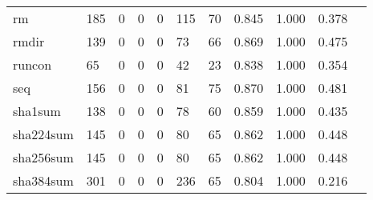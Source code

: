 \begin{longtable}{lp{1.10cm}p{1.10cm}p{1.10cm}p{1.10cm}p{1.10cm}p{1.10cm}p{1.10cm}p{1.10cm}p{1.10cm}p{1.10cm}}
rm        &                    185 &                                  0 &                                 0 &                                0 &                               115 &                              70 &                          0.845 &                                 1.000 &                               0.378 \\
rmdir     &                    139 &                                  0 &                                 0 &                                0 &                                73 &                              66 &                          0.869 &                                 1.000 &                               0.475 \\
runcon    &                     65 &                                  0 &                                 0 &                                0 &                                42 &                              23 &                          0.838 &                                 1.000 &                               0.354 \\
seq       &                    156 &                                  0 &                                 0 &                                0 &                                81 &                              75 &                          0.870 &                                 1.000 &                               0.481 \\
sha1sum   &                    138 &                                  0 &                                 0 &                                0 &                                78 &                              60 &                          0.859 &                                 1.000 &                               0.435 \\
sha224sum &                    145 &                                  0 &                                 0 &                                0 &                                80 &                              65 &                          0.862 &                                 1.000 &                               0.448 \\
sha256sum &                    145 &                                  0 &                                 0 &                                0 &                                80 &                              65 &                          0.862 &                                 1.000 &                               0.448 \\
sha384sum &                    301 &                                  0 &                                 0 &                                0 &                               236 &                              65 &                          0.804 &                                 1.000 &                               0.216 \\

\end{longtable}
